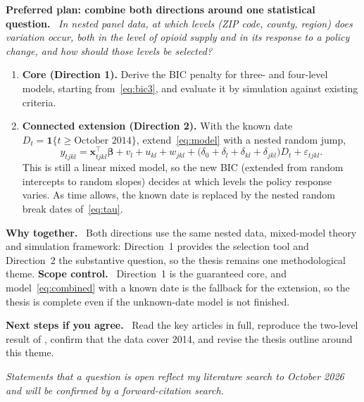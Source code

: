 \documentclass[10pt]{article}
\newcommand{\para}[1]{\textbf{#1}\ }
\newcommand{\ind}{\mathbf{1}}
\begin{document}
\para{Preferred plan: combine both directions around one statistical question.} \emph{In nested panel data, at which levels (ZIP code, county, region) does variation occur, both in the level of opioid supply and in its response to a policy change, and how should those levels be selected?}

\begin{enumerate}[label=(\roman*)]
  \item \textbf{Core (Direction 1).} Derive the BIC penalty for three- and four-level models, starting from~\eqref{eq:bic3}, and evaluate it by simulation against existing criteria.
  \item \textbf{Connected extension (Direction 2).} With the known date $D_t = \ind\{t \ge \text{October 2014}\}$, extend~\eqref{eq:model} with a nested random jump,
  \begin{equation}\label{eq:combined}
    y_{tjkl} = \bm{x}_{tjkl}^{\top}\bm\beta + v_l + u_{kl} + w_{jkl} + \bigl(\delta_0 + \delta_l + \delta_{kl} + \delta_{jkl}\bigr) D_t + \varepsilon_{tjkl}.
  \end{equation}
  This is still a linear mixed model, so the new BIC (extended from random intercepts to random slopes) decides at which levels the policy response varies. As time allows, the known date is replaced by the nested random break dates of~\eqref{eq:tau}.
\end{enumerate}

\para{Why together.} Both directions use the same nested data, mixed-model theory and simulation framework: Direction~1 provides the selection tool and Direction~2 the substantive question, so the thesis remains one methodological theme. \para{Scope control.} Direction~1 is the guaranteed core, and model~\eqref{eq:combined} with a known date is the fallback for the extension, so the thesis is complete even if the unknown-date model is not finished.

\para{Next steps if you agree.} Read the key articles in full, reproduce the two-level result of \citet{cho2024}, confirm that the data cover 2014, and revise the thesis outline around this theme.

{\small\emph{Statements that a question is open reflect my literature search to October 2026 and will be confirmed by a forward-citation search.}}


{\small}
\end{document}
